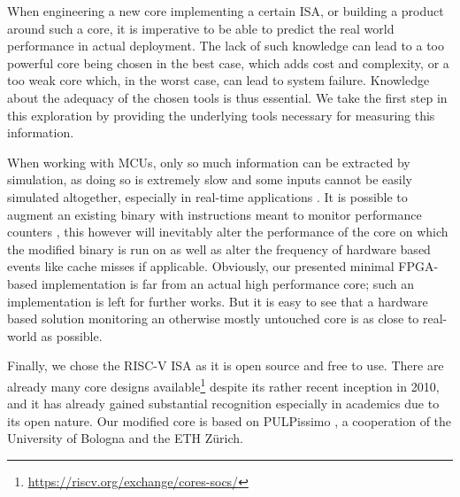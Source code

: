 \documentclass[../bachelor_paper.tex]{subfiles}
\begin{document}
When engineering a new core implementing a certain \ac{ISA}, or building a product around such a core, it is imperative to be able to predict the real world performance in actual deployment. The lack of such knowledge can lead to a too powerful core being chosen in the best case, which adds cost and complexity, or a too weak core which, in the worst case, can lead to system failure. Knowledge about the adequacy of the chosen tools is thus essential. We take the first step in this exploration by providing the underlying tools necessary for measuring this information.

When working with \acp{MCU}, only so much information can be extracted by simulation, as doing so is extremely slow \cite{eeckhoutDesigningComputerArchitecture2003,kaoHardwareApproachRealTime2007} and some inputs cannot be easily simulated altogether, especially in real-time applications \cite{kaoHardwareApproachRealTime2007}. It is possible to augment an existing binary with instructions meant to monitor performance counters \cite{eeckhoutQuantifyingImpactInput}, this however will inevitably alter the performance of the core on which the modified binary is run on as well as alter the frequency of hardware based events like cache misses if applicable. Obviously, our presented minimal FPGA-based implementation is far from an actual high performance core; such an implementation is left for further works. But it is easy to see that a hardware based solution monitoring an otherwise mostly untouched core is as close to real-world as possible.

Finally, we chose the RISC-V ISA \cite{RISCVTechnicalSpecification} as it is open source and free to use. There are already many core designs available\footnote{\url{https://riscv.org/exchange/cores-socs/}} despite its rather recent inception in 2010, and it has already gained substantial recognition especially in academics due to its open nature. Our modified core is based on PULPissimo \cite{GitHubPulpplatformPulpissimo2021}, a cooperation of the University of Bologna and the ETH Z\"urich.
\end{document}
